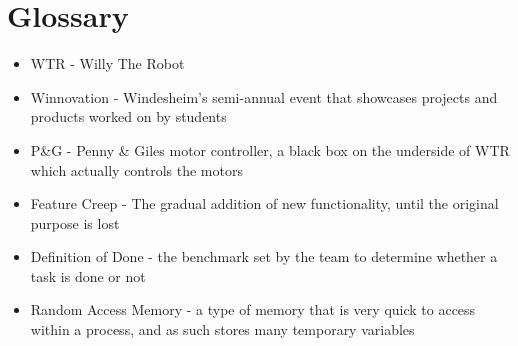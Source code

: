 \section{Glossary}
\begin{itemize}
\item \label{trm::WTR} WTR - Willy The Robot
\item \label{trm::Winnovation} Winnovation - Windesheim's semi-annual event that showcases projects and products worked on by students
\item \label{trm::PGE}P\&G - Penny \& Giles motor controller, a black box on the underside of WTR which actually controls the motors
\item \label{trm::FC} Feature Creep - The gradual addition of new functionality, until the original purpose is lost
\item \label{trm::DOD} Definition of Done - the benchmark set by the team to determine whether a task is done or not
\item \label{trm::RAM} Random Access Memory - a type of memory that is very quick to access within a process, and as such stores many temporary variables
\end{itemize}